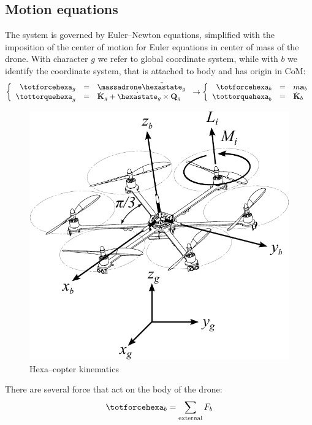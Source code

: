 \subsection{Motion equations}
The system is governed by Euler--Newton equations, simplified with the imposition of the center of motion for Euler equations in center of mass of the drone. With character $g$ we refer to global coordinate system, while with $b$ we identify the coordinate system, that is attached to body and has origin in CoM:
\begin{equation}
\left\{
\begin{array}{rcl}
\totforcehexa_g & = & \massadrone \ddot{\hexastate}_g \\
\tottorquehexa_g & = & \dot{\mathbf{K}}_g + \dot{\hexastate}_g \times \mathbf{Q}_g%
\end{array}
\right.  \rightarrow  \left\{
\begin{array}{rcl}
\totforcehexa_b & = & m \mathbf{a}_b \\
\tottorquehexa_b & = & \dot{\mathbf{K}}_b%
\end{array}
\right.
\end{equation}
\begin{figure}[h]
	\centering
	\includegraphics[scale=0.55]{ch3/img/hexacopter_kine.pdf}
	\caption{Hexa--copter kinematics}
\end{figure}
There are several force that act on the body of the drone:
\begin{equation}
\totforcehexa_b = \sum\limits_{\mathrm{external}} F_b
\end{equation}

